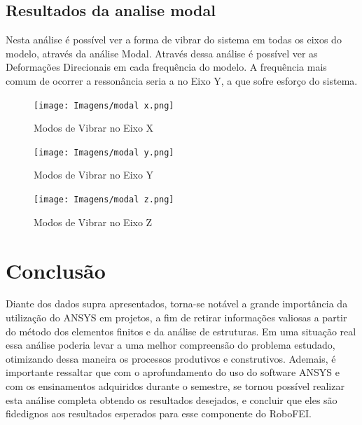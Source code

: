 \documentclass[deposito, acronym, symbols]{fei}
\begin{document}
\newpage
 
\section{Resultados da analise modal}

Nesta análise é possível ver a forma de vibrar do sistema em todas os eixos do modelo, através da análise Modal. Através dessa análise é possível ver as Deformações Direcionais em cada frequência do modelo. A frequência mais comum de ocorrer a ressonância seria a no Eixo Y, a que sofre esforço do sistema.

 \begin{figure}[!htb]
  \centering
    \caption{Modos de Vibrar no Eixo X}
    \texttt{[image: Imagens/modal x.png]}
    \label{fig: Setup do Workbench}
 \end{figure}
 
 \begin{figure}[!htb]
   \centering
    \caption{Modos de Vibrar no Eixo Y}
    \texttt{[image: Imagens/modal y.png]}
    \label{fig: Setup do Workbench}
 \end{figure}
 
 \begin{figure}[!htb]
  \centering
    \caption{Modos de Vibrar no Eixo Z}
    \texttt{[image: Imagens/modal z.png]}
    \label{fig: Setup do Workbench}
 \end{figure}
 
\chapter{Conclusão}

Diante dos dados supra apresentados, torna-se notável a grande importância da utilização do ANSYS em projetos, a fim de retirar informações valiosas a partir do método dos elementos finitos e da análise de estruturas. Em uma situação real essa análise poderia levar a uma melhor compreensão do problema estudado, otimizando dessa maneira os processos produtivos e construtivos. Ademais, é importante ressaltar que com o aprofundamento do uso do software ANSYS e com os ensinamentos adquiridos durante o semestre, se tornou possível realizar esta análise completa obtendo os resultados desejados, e concluir que eles são fidedignos aos resultados esperados para esse componente do RoboFEI.

\printbibliography[type=online]
\nocite{*}
\end{document}
